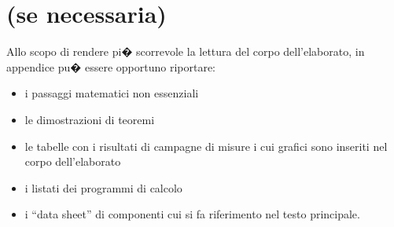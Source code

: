 \chapter{(se necessaria)}

Allo scopo di rendere pi� scorrevole la lettura del corpo dell'elaborato, in appendice pu�
essere opportuno riportare:
\begin{itemize}
\item i passaggi matematici non essenziali
\item le dimostrazioni di teoremi
\item le tabelle con i risultati di campagne di misure i cui grafici sono inseriti nel corpo
dell'elaborato
\item i listati dei programmi di calcolo
\item i ``data sheet'' di componenti cui si fa riferimento nel testo principale.
\end{itemize}